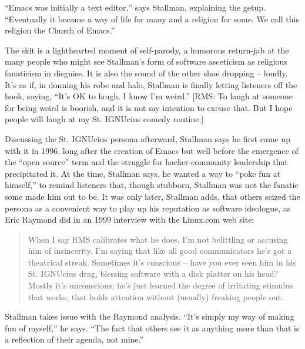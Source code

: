 ``Emacs was initially a text editor,'' says Stallman, explaining the getup. ``Eventually it became a way of life for many and a religion for some. We call this religion the Church of Emacs.''

The skit is a lighthearted moment of self-parody, a humorous return-jab at the many people who might see Stallman's form of software asceticism as religious fanaticism in disguise. It is also the sound of the other shoe dropping -- loudly. It's as if, in donning his robe and halo, Stallman is finally letting listeners off the hook, saying, ``It's OK to laugh. I know I'm weird.''  [RMS: To laugh at someone for being weird is boorish, and it is not my intention to excuse that.  But I hope people will laugh at my St. IGNUcius comedy routine.]

Discussing the St. IGNUcius persona afterward, Stallman says he first came up with it in 1996, long after the creation of Emacs but well before the emergence of the ``open source'' term and the struggle for hacker-community leadership that precipitated it. At the time, Stallman says, he wanted a way to ``poke fun at himself,'' to remind listeners that, though stubborn, Stallman was not the fanatic some made him out to be. It was only later, Stallman adds, that others seized the persona as a convenient way to play up his reputation as software ideologue, as Eric Raymond did in an 1999 interview with the Linux.com web site:

\begin{quote}
When I say RMS calibrates what he does, I'm not belittling or accusing him of insincerity. I'm saying that like all good communicators he's got a theatrical streak. Sometimes it's conscious -- have you ever seen him in his St. IGNUcius drag, blessing software with a disk platter on his head? Mostly it's unconscious; he's just learned the degree of irritating stimulus that works, that holds attention without (usually) freaking people out.
\end{quote}

Stallman takes issue with the Raymond analysis. ``It's simply my way of making fun of myself,'' he says. ``The fact that others see it as anything more than that is a reflection of their agenda, not mine.''

